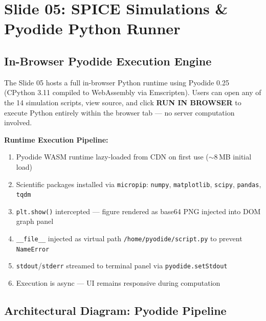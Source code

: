 \documentclass[12pt, a4paper]{article}
\begin{document}
\section{Slide 05: SPICE Simulations \& Pyodide Python Runner}
\label{sec:spice}

\subsection{In-Browser Pyodide Execution Engine}

The Slide 05 hosts a full in-browser Python runtime using Pyodide 0.25
(CPython 3.11 compiled to WebAssembly via Emscripten). Users can open any of
the 14 simulation scripts, view source, and click \textbf{RUN IN BROWSER} to
execute Python entirely within the browser tab --- no server computation involved.

\begin{cyanbox}
\textbf{Runtime Execution Pipeline:}
\begin{enumerate}[noitemsep]
  \item Pyodide WASM runtime lazy-loaded from CDN on first use ($\sim$8\,MB initial load)
  \item Scientific packages installed via \texttt{micropip}: \texttt{numpy}, \texttt{matplotlib}, \texttt{scipy}, \texttt{pandas}, \texttt{tqdm}
  \item \texttt{plt.show()} intercepted — figure rendered as base64 PNG injected into DOM graph panel
  \item \texttt{\_\_file\_\_} injected as virtual path \texttt{/home/pyodide/script.py} to prevent \texttt{NameError}
  \item \texttt{stdout}/\texttt{stderr} streamed to terminal panel via \texttt{pyodide.setStdout}
  \item Execution is async — UI remains responsive during computation
\end{enumerate}
\end{cyanbox}

\subsection{Architectural Diagram: Pyodide Pipeline}
\end{document}
